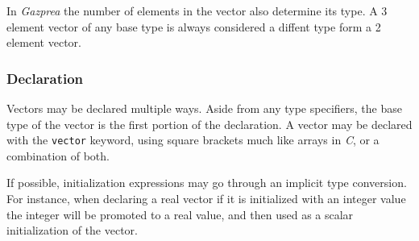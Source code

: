 \documentclass[../../gazprea.tex]{subfiles}
\begin{document}
		In \textit{Gazprea} the number of elements in the vector also determine its type. A 3 element vector of any base
		type is always considered a diffent type form a 2 element vector.

		\subsubsection{Declaration}

			Vectors may be declared multiple ways. Aside from any type specifiers, the base type of the vector is the
			first portion of the declaration. A vector may be declared with the \texttt{vector} keyword, using square
			brackets much like arrays in \textit{C}, or a combination of both.

			If possible, initialization expressions may go through an implicit type conversion. For instance, when
			declaring a real vector if it is initialized with an integer value the integer will be promoted to a real
			value, and then used as a scalar initialization of the vector.
\end{document}
